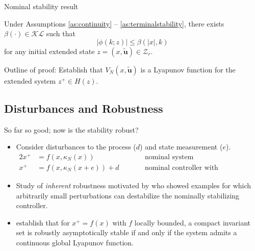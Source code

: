 \documentclass{beamer}
\newcommand{\abs}[1]{\left\lvert #1 \right\rvert}
\newcommand{\useq}{\mathbf{u}}
\begin{document}
\begin{frame}{Nominal stability result}
\begin{theorem}
\label{th:nominalstability}
Under Assumptions \ref{as:continuity} -- \ref{as:terminalstability}, there exists
$\beta(\cdot) \in \mathcal{KL}$ such that 
\begin{equation*}
\abs{\phi(k;z)} \leq \beta(\abs{x},k)
\end{equation*}
for any initial extended state $z = (x,\tilde{\mathbf{u}}) \in \mathcal{Z}_r$.
\end{theorem}

Outline of proof: Establish that $V_N(x,\tilde{\useq})$ is a Lyapunov
function for the extended system $z^+ \in H(z)$.

\end{frame}

\subsection{Disturbances and Robustness}

\begin{frame}{So far so good; now is the stability robust?}

\begin{itemize}
\item Consider disturbances to the process ($d$) and state measurement
($e$). 
\begin{alignat*}{2}
x^+ &= f(x, \kappa_N(x)) &\qquad &\text{nominal system} \\
x^+ &= f(x, \kappa_N(x+e)) + d &\qquad &\text{nominal controller with disturbances}
\end{alignat*}

\item Study of \textit{inherent} robustness motivated by \cite{teel:2004} who
showed examples for which \alert{arbitrarily small perturbations} can
\alert{destabilize} the nominally stabilizing controller.

\item \cite{kellet:teel:2004a} establish that for $x^+=f(x)$ with $f$
  locally bounded, a compact invariant set is robustly asymptotically
  stable if and only if the system admits a \alert{continuous} global
  Lyapunov function.
\end{itemize}
\end{frame}
\end{document}
